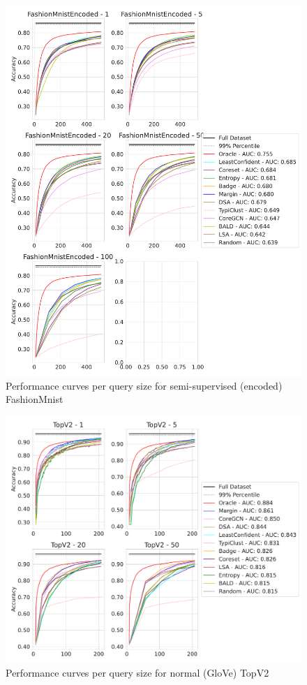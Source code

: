 \documentclass[]{article}
\begin{document}
\begin{figure}[H]
    \centering
    \caption{Performance curves per query size for semi-supervised (encoded) FashionMnist}
    \includegraphics[width=\linewidth]{img/eval_fmnist_enc}
\end{figure}
\begin{figure}[H]
    \centering
    \caption{Performance curves per query size for normal (GloVe) TopV2}
\includegraphics[width=\linewidth]{img/eval_topv2}
\end{figure}
\end{document}
